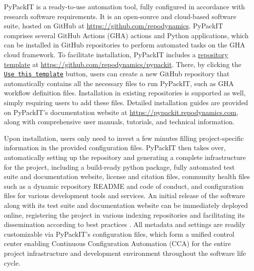 \documentclass{article}
\begin{document}
PyPackIT is a ready-to-use automation tool, fully configured in accordance with research software requirements. It is an open-source and cloud-based software suite, hosted on GitHub at \url{https://github.com/repodynamics}. PyPackIT comprises several GitHub Actions (GHA) actions and Python applications, which can be installed in GitHub repositories to perform automated tasks on the GHA cloud framework. To facilitate installation, PyPackIT includes a \href{https://docs.github.com/en/repositories/creating-and-managing-repositories/creating-a-repository-from-a-template}{repository template} at \url{https://github.com/repodynamics/pypackit}. There, by clicking the \href{https://github.com/new?template_name=PyPackIT&template_owner=RepoDynamics}{\texttt{Use this template}} button, users can create a new GitHub repository that automatically contains all the necessary files to run PyPackIT, such as GHA workflow definition files. Installation in existing repositories is supported as well, simply requiring users to add these files. Detailed installation guides are provided on PyPackIT's documentation website at \url{https://pypackit.repodynamics.com}, along with comprehensive user manuals, tutorials, and technical information.

Upon installation, users only need to invest a few minutes filling project-specific information in the provided configuration files. PyPackIT then takes over, automatically setting up the repository and generating a complete infrastructure for the project, including a build-ready python package, fully automated test suite and documentation website, license and citation files, community health files such as a dynamic repository README and code of conduct, and configuration files for various development tools and services. An initial release of the software along with its test suite and documentation website can be immediately deployed online, registering the project in various indexing repositories and facilitating its dissemination according to best practices \cite{4SimpleRecs, CICDSystematicReview}. All metadata and settings are readily customizable via PyPackIT's configuration files, which form a unified control center enabling Continuous Configuration Automation (CCA) for the entire project infrastructure and development environment throughout the software life cycle.
\end{document}
